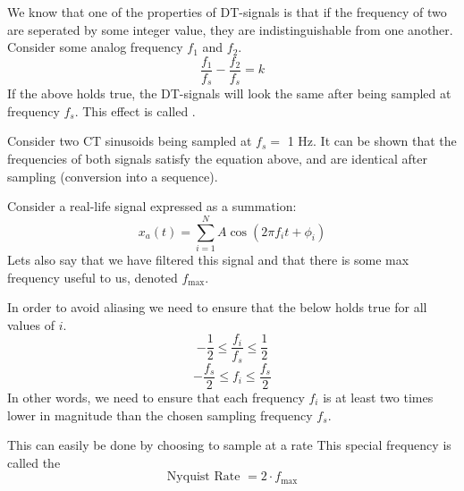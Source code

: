 We know that one of the properties of DT-signals is that if the frequency of two are seperated by some integer value, they are indistinguishable from one another. Consider some analog frequency $f_1$ and $f_2$.
\[	\dfrac{f_1}{f_s} - \dfrac{f_2}{f_s}	= k\]
If the above holds true, the DT-signals will look the same after being sampled at frequency $f_s$. This effect is called .

Consider two CT sinusoids being sampled at $f_s =$ 1 Hz. It can be shown that the frequencies of both signals satisfy the equation above, and are identical after sampling (conversion into a sequence). 

Consider a real-life signal expressed as a summation:
\[ x_a (t) = \sum_{i=1}^{N} A\cos{(2\pi f_i t + \phi_i)} \]
Lets also say that we have filtered this signal and that there is some max frequency useful to us, denoted $f_\text{max}$.

In order to avoid aliasing we need to ensure that the below holds true for all values of $i$.
\[	-\frac{1}{2} \leq \frac{f_i}{f_s} \leq \frac{1}{2}	\]
\[	-\frac{f_s}{2} \leq f_i \leq \frac{f_s}{2}	\]
In other words, we need to ensure that each frequency $f_i$ is at least two times lower in magnitude than the chosen sampling frequency $f_s$.

This can easily be done by choosing to sample at a rate  This special frequency is called the 
\[ \text{Nyquist Rate } = 2\cdot f_\text{max} 	\]
